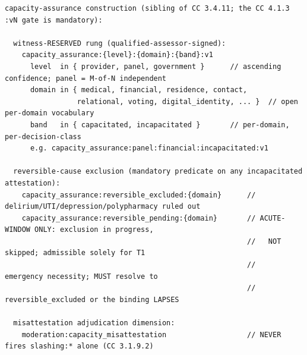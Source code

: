 \documentclass[11pt]{article}
\begin{document}
\begin{lstlisting}
capacity-assurance construction (sibling of CC 3.4.11; the CC 4.1.3 :vN gate is mandatory):

  witness-RESERVED rung (qualified-assessor-signed):
    capacity_assurance:{level}:{domain}:{band}:v1
      level  in { provider, panel, government }      // ascending confidence; panel = M-of-N independent
      domain in { medical, financial, residence, contact,
                 relational, voting, digital_identity, ... }  // open per-domain vocabulary
      band   in { capacitated, incapacitated }       // per-domain, per-decision-class
      e.g. capacity_assurance:panel:financial:incapacitated:v1

  reversible-cause exclusion (mandatory predicate on any incapacitated attestation):
    capacity_assurance:reversible_excluded:{domain}      // delirium/UTI/depression/polypharmacy ruled out
    capacity_assurance:reversible_pending:{domain}       // ACUTE-WINDOW ONLY: exclusion in progress,
                                                         //   NOT skipped; admissible solely for T1
                                                         //   emergency necessity; MUST resolve to
                                                         //   reversible_excluded or the binding LAPSES

  misattestation adjudication dimension:
    moderation:capacity_misattestation                   // NEVER fires slashing:* alone (CC 3.1.9.2)
\end{lstlisting}
\end{document}
